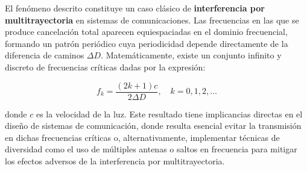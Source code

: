 El fenómeno descrito constituye un caso clásico de \textbf{interferencia por multitrayectoria} en sistemas de comunicaciones. Las frecuencias en las que se 
produce cancelación total aparecen equiespaciadas en el dominio frecuencial, formando un patrón periódico cuya periodicidad depende directamente de la 
diferencia de caminos $\Delta D$. Matemáticamente, existe un conjunto infinito y discreto de frecuencias críticas dadas por la expresión:

\[
f_k = \frac{(2k+1)c}{2\Delta D}, \quad k = 0, 1, 2, \ldots
\]

donde $c$ es la velocidad de la luz. Este resultado tiene implicancias directas en el diseño de sistemas de comunicación, donde resulta esencial evitar la 
transmisión en dichas frecuencias críticas o, alternativamente, implementar técnicas de diversidad como el uso de múltiples antenas o saltos en frecuencia 
para mitigar los efectos adversos de la interferencia por multitrayectoria.
